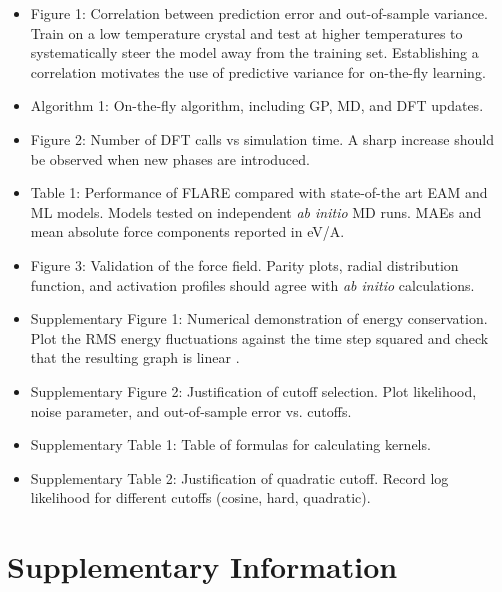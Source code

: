 \documentclass[%
reprint,
superscriptaddress,
amsmath,amssymb,
aps,
prl,
]{revtex4-1}
\begin{document}
\begin{itemize}

\item Figure 1: Correlation between prediction error and out-of-sample variance. Train on a low temperature crystal and test at higher temperatures to systematically steer the model away from the training set. Establishing a correlation motivates the use of predictive variance for on-the-fly learning.

\item Algorithm 1: On-the-fly algorithm, including GP, MD, and DFT updates.

\item Figure 2: Number of DFT calls vs simulation time. A sharp increase should be observed when new phases are introduced.

\item Table 1: Performance of FLARE compared with state-of-the art EAM and ML models. Models tested on independent \textit{ab initio} MD runs. MAEs and mean absolute force components reported in eV/A.

\item Figure 3: Validation of the force field. Parity plots, radial distribution function, and activation profiles should agree with \textit{ab initio} calculations.

\item Supplementary Figure 1: Numerical demonstration of energy conservation. Plot the RMS energy fluctuations against the time step squared and check that the resulting graph is linear \cite{allen2017computer}.

\item Supplementary Figure 2: Justification of cutoff selection. Plot likelihood, noise parameter, and out-of-sample error vs. cutoffs.

\item Supplementary Table 1: Table of formulas for calculating kernels.

\item Supplementary Table 2: Justification of quadratic cutoff. Record log likelihood for different cutoffs (cosine, hard, quadratic).

\end{itemize}

\section{Supplementary Information}
\end{document}
